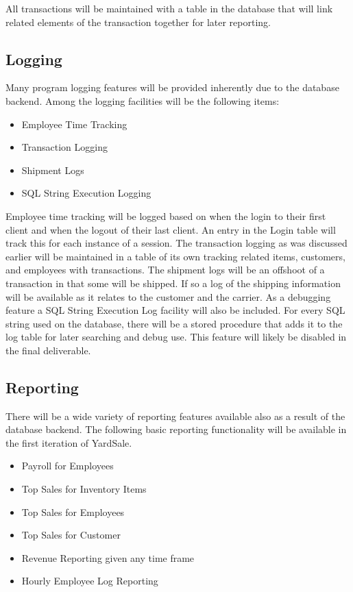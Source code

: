 \documentclass[a4paper,10pt]{article}
\begin{document}
All transactions will be maintained with a table in the database that will link related elements of the transaction together for later reporting.

\subsection{Logging}

Many program logging features will be provided inherently due to the database backend. Among the logging facilities will be the following items:

\begin{itemize}
\item {Employee Time Tracking}
\item {Transaction Logging}
\item {Shipment Logs}
\item {SQL String Execution Logging}
\end{itemize}

Employee time tracking will be logged based on when the login to their first client and when the logout of their last client. An entry in the Login table will track this for each instance of a session. The transaction logging as was discussed earlier will be maintained in a table of its own tracking related items, customers, and employees with transactions. The shipment logs will be an offshoot of a transaction in that some will be shipped. If so a log of the shipping information will be available as it relates to the customer and the carrier. As a debugging feature a SQL String Execution Log facility will also be included. For every SQL string used on the database, there will be a stored procedure that adds it to the log table for later searching and debug use. This feature will likely be disabled in the final deliverable.

\subsection{Reporting}

There will be a wide variety of reporting features available also as a result of the database backend. The following basic reporting functionality will be available in the first iteration of YardSale.

\begin{itemize}
\item{Payroll for Employees}
\item{Top Sales for Inventory Items}
\item{Top Sales for Employees}
\item{Top Sales for Customer}
\item{Revenue Reporting given any time frame}
\item{Hourly Employee Log Reporting}
\end{itemize}
\end{document}
